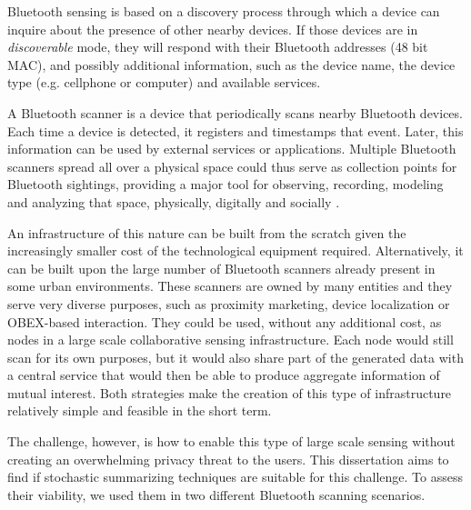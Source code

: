 Bluetooth sensing is based on a discovery process through
which a device can inquire about the presence of other nearby devices.
If those devices are in \emph{discoverable} mode, they will respond
with their Bluetooth addresses (48 bit MAC), and possibly additional
information, such as the device name, the device type (e.g. cellphone
or computer) and available services.

A Bluetooth scanner is a device that periodically scans nearby
Bluetooth devices. Each time a device is detected, it registers and
timestamps that event. Later, this information can be used by external
services or applications. Multiple Bluetooth scanners spread all over
a physical space could thus serve as collection points for Bluetooth
sightings, providing a major tool for observing, recording, modeling
and analyzing that space, physically, digitally and socially
\cite{Oneill:2006vq}.

An infrastructure of this nature can be built from the scratch given
the increasingly smaller cost of the technological equipment required.
Alternatively, it can be built upon the large number of Bluetooth
scanners already present in some urban environments. These scanners
are owned by many entities and they serve very diverse purposes, such
as proximity marketing, device localization or OBEX-based interaction.
They could be used, without any additional cost, as nodes in a large
scale collaborative sensing infrastructure. Each node would still scan
for its own purposes, but it would also share part of the generated
data with a central service that would then be able to produce
aggregate information of mutual interest. Both strategies make the
creation of this type of infrastructure relatively simple and feasible
in the short term.

The challenge, however, is how to enable this type of large scale
sensing without creating an overwhelming privacy threat to the users.
This dissertation aims to find if stochastic summarizing techniques
are suitable for this challenge. To assess their viability, we used
them in two different Bluetooth scanning scenarios.



